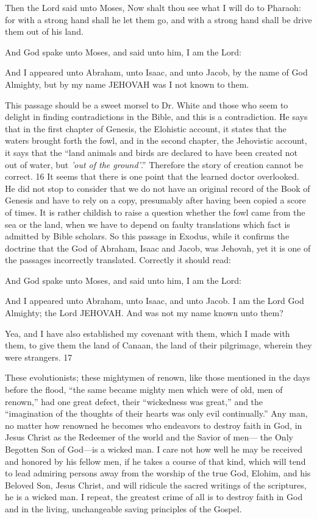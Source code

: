 Then the Lord said unto Moses, Now shalt thou see what I will do to Pharaoh: for with a
strong hand shall he let them go, and with a strong hand shall be drive them out of his land.

And God spake unto Moses, and said unto him, I am the Lord:

And I appeared unto Abraham, unto Isaac, and unto Jacob, by the name of God Almighty,
but by my name JEHOVAH was I not known to them.

This passage should be a sweet morsel to Dr. White and those who seem to delight in finding
contradictions in the Bible, and this is a contradiction. He says that in the first chapter of
Genesis, the Elohistic account, it states that the waters brought forth the fowl, and in the
second chapter, the Jehovistic account, it says that the ``land animals and birds are declared to
have been created not out of water, but \textit{'out of the ground'}.'' Therefore the story of creation
cannot be correct. 16 It seems that there is one point that the learned doctor overlooked. He
did not stop to consider that we do not have an original record of the Book of Genesis and
have to rely on a copy, presumably after having been copied a score of times. It is rather
childish to raise a question whether the fowl came from the sea or the land, when we have to
depend on faulty translations which fact is admitted by Bible scholars. So this passage in
Exodus, while it confirms the doctrine that the God of Abraham, Isaac and Jacob, was
Jehovah, yet it is one of the passages incorrectly translated. Correctly it should read:

And God spake unto Moses, and said unto him, I am the Lord:

And I appeared unto Abraham, unto Isaac, and unto Jacob. I am the Lord God Almighty; the
Lord JEHOVAH. And was not my name known unto them?

Yea, and I have also established my covenant with them, which I made with them, to give
them the land of Canaan, the land of their pilgrimage, wherein they were strangers. 17

These evolutionists; these mightymen of renown, like those mentioned in the days before the
flood, ``the same became mighty men which were of old, men of renown,'' had one great
defect, their ``wickedness was great,'' and the ``imagination of the thoughts of their hearts was
only evil continually.'' Any man, no matter how renowned he becomes who endeavors to
destroy faith in God, in Jesus Christ as the Redeemer of the world and the Savior of men—
the Only Begotten Son of God—is a wicked man. I care not how well he may be received
and honored by his fellow men, if he takes a course of that kind, which will tend to lead
admiring persons away from the worship of the true God, Elohim, and his Beloved Son,
Jesus Christ, and will ridicule the sacred writings of the scriptures, he is a wicked man. I
repeat, the greatest crime of all is to destroy faith in God and in the living, unchangeable
saving principles of the Gospel.

